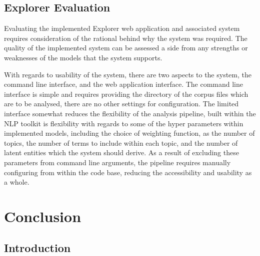 \documentclass[10pt]{report}
\begin{document}
\clearpage
\section{Explorer Evaluation}
Evaluating the implemented Explorer web application and associated system requires consideration of the rational behind why the system was required. The quality of the implemented system can be assessed a side from any strengths or weaknesses of the models that the system supports.

With regards to usability of the system, there are two aspects to the system, the command line interface, and the web application interface. The command line interface is simple and requires providing the directory of the corpus files which are to be analysed, there are no other settings for configuration. The limited interface somewhat reduces the flexibility of the analysis pipeline, built within the NLP toolkit is flexibility with regards to some of the hyper parameters within implemented models, including the choice of weighting function, as the number of topics, the number of terms to include within each topic, and the number of latent entities which the system should derive. As a result of excluding these parameters from command line arguments, the pipeline requires manually configuring from within the code base, reducing the accessibility and usability as a whole. 




%
%
%
%
\chapter{Conclusion}

\section{Introduction}

\renewcommand{\baselinestretch}{1.0}\normalsize


\end{document}
